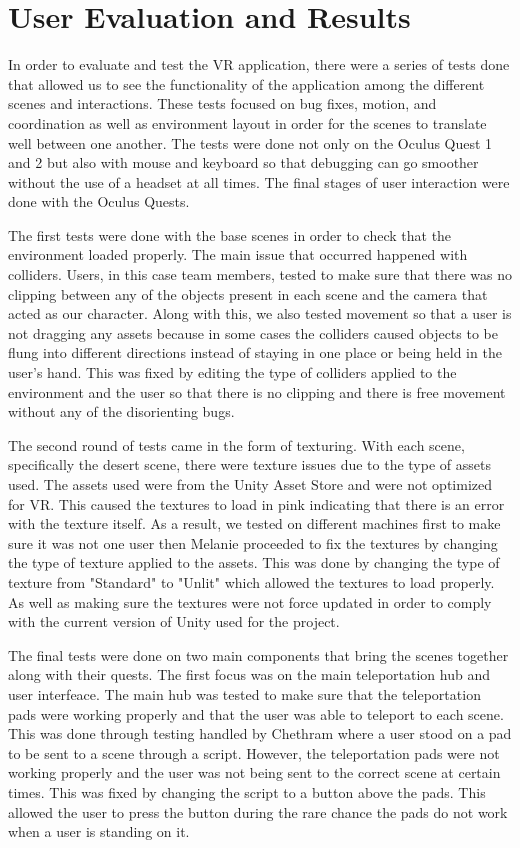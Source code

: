 \documentclass{vgtc}                          %
\begin{document}
\section{User Evaluation and Results}
In order to evaluate and test the VR application, there were a series of tests done that allowed us to see the functionality of the application among the different scenes and interactions. These tests focused on bug fixes, motion, and coordination as well as environment
layout in order for the scenes to translate well between one another. The tests were done not only on the Oculus Quest 1 and 2 but also with mouse and keyboard so that debugging can go smoother without the use of a headset at all times. The final stages of user interaction
were done with the Oculus Quests.

The first tests were done with the base scenes in order to check that the environment loaded properly. The main issue that occurred happened with colliders. Users, in this case team members, tested to make sure that there was no clipping between any of the objects present in each scene and the camera that
acted as our character. Along with this, we also tested movement so that a user is not dragging any assets because in some cases the colliders caused objects to be flung into different directions instead of staying in one place or being held in the user's hand. This was fixed by editing the type of colliders
applied to the environment and the user so that there is no clipping and there is free movement without any of the disorienting bugs.

The second round of tests came in the form of texturing. With each scene, specifically the desert scene, there were texture issues due to the type of assets used. The assets used were from the Unity Asset Store and were not optimized for VR. This caused the textures to load in pink indicating that there is an error
with the texture itself. As a result, we tested on different machines first to make sure it was not one user then Melanie proceeded to fix the textures by changing the type of texture applied to the assets. This was done by changing the type of texture from "Standard" to "Unlit" which allowed the textures to load properly. As well as making
sure the textures were not force updated in order to comply with the current version of Unity used for the project.


The final tests were done on two main components that bring the scenes together along with their quests. The first focus was on the main teleportation hub and user interfeace. The main hub was tested to make sure that the teleportation pads were working properly and that the user was able to teleport to each scene. This was done through testing handled by Chethram where
a user stood on a pad to be sent to a scene through a script. However, the teleportation pads were not working properly and the user was not being sent to the correct scene at certain times. This was fixed by changing the script to a button above the pads. This allowed the user to press the button during the rare chance the pads do not work when a user is standing on it.
\end{document}
